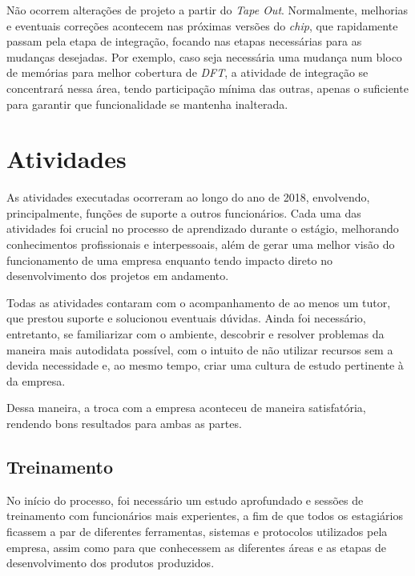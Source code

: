 \documentclass[
	12pt,				%
    oneside,			%
	a4paper,			%
	english,			%
	french,				%
	spanish,			%
	brazil				%
	]{abntex2}
\begin{document}
Não ocorrem alterações de projeto a partir do \textit{Tape Out}. Normalmente, melhorias e eventuais correções acontecem nas próximas versões do \textit{chip}, que rapidamente passam pela etapa de integração, focando nas etapas necessárias para as mudanças desejadas. Por exemplo, caso seja necessária uma mudança num bloco de memórias para melhor cobertura de \textit{DFT}, a atividade de integração se concentrará nessa área, tendo participação mínima das outras, apenas o suficiente para garantir que funcionalidade se mantenha inalterada.

\chapter{Atividades}

As atividades executadas ocorreram ao longo do ano de 2018, envolvendo, principalmente, funções de suporte a outros funcionários. Cada uma das atividades foi crucial no processo de aprendizado durante o estágio, melhorando conhecimentos profissionais e interpessoais, além de gerar uma melhor visão do funcionamento de uma empresa enquanto tendo impacto direto no desenvolvimento dos projetos em andamento.

Todas as atividades contaram com o acompanhamento de ao menos um tutor, que prestou suporte e solucionou eventuais dúvidas. Ainda foi necessário, entretanto, se familiarizar com o ambiente, descobrir e resolver problemas da maneira mais autodidata possível, com o intuito de não utilizar recursos sem a devida necessidade e, ao mesmo tempo, criar uma cultura de estudo pertinente à da empresa. 

Dessa maneira, a troca com a empresa aconteceu de maneira satisfatória, rendendo bons resultados para ambas as partes.

\section{Treinamento}

No início do processo, foi necessário um estudo aprofundado e sessões de treinamento com funcionários mais experientes, a fim de que todos os estagiários ficassem a par de diferentes ferramentas, sistemas e protocolos utilizados pela empresa, assim como para que conhecessem as diferentes áreas e as etapas de desenvolvimento dos produtos produzidos.
\end{document}
